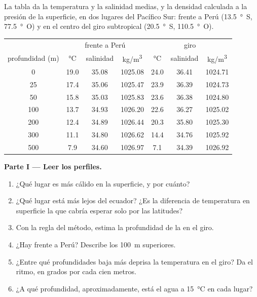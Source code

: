 \begin{problem}
\label{pb:g10:layered-ocean:1}
La tabla da la temperatura y la salinidad medias, y la densidad calculada a
la presión de la superficie, en dos lugares del Pacífico Sur: frente a Perú
(\qty{13.5}{\degree S}, \qty{77.5}{\degree O}) y en el centro del giro
subtropical (\qty{20.5}{\degree S}, \qty{110.5}{\degree O}).

\begin{center}
\small
\begin{tabular}{c|ccc|ccc}
\hline
 & \multicolumn{3}{c|}{frente a Perú} & \multicolumn{3}{c}{giro} \\
profundidad (\unit{m}) & \unit{\degreeCelsius} & salinidad & \unit{kg/m^3} & \unit{\degreeCelsius} & salinidad & \unit{kg/m^3} \\
\hline
0 & 19.0 & 35.08 & 1025.08 & 24.0 & 36.41 & 1024.71 \\
25 & 17.4 & 35.06 & 1025.47 & 23.9 & 36.39 & 1024.73 \\
50 & 15.8 & 35.03 & 1025.83 & 23.6 & 36.38 & 1024.80 \\
100 & 13.7 & 34.93 & 1026.20 & 22.6 & 36.27 & 1025.02 \\
200 & 12.4 & 34.89 & 1026.44 & 20.3 & 35.80 & 1025.30 \\
300 & 11.1 & 34.80 & 1026.62 & 14.4 & 34.76 & 1025.92 \\
500 & 7.9 & 34.60 & 1026.97 & 7.1 & 34.39 & 1026.92 \\
\hline
\end{tabular}
\end{center}

\medskip
\noindent\textbf{Parte I --- Leer los perfiles.}
\begin{enumerate}
  \item ¿Qué lugar es más cálido en la superficie, y por cuánto?
  \item ¿Qué lugar está más lejos del ecuador? ¿Es la diferencia de
        temperatura en superficie la que cabría esperar solo por las
        latitudes?
  \item Con la regla del método, estima la profundidad de la 
        en el giro.
  \item ¿Hay  frente a Perú? Describe los \qty{100}{m}
        superiores.
  \item ¿Entre qué profundidades baja más deprisa la temperatura en el giro?
        Da el ritmo, en grados por cada cien metros.
  \item ¿A qué profundidad, aproximadamente, está el agua a
        \qty{15}{\degreeCelsius} en cada lugar?
\end{enumerate}


\end{problem}
